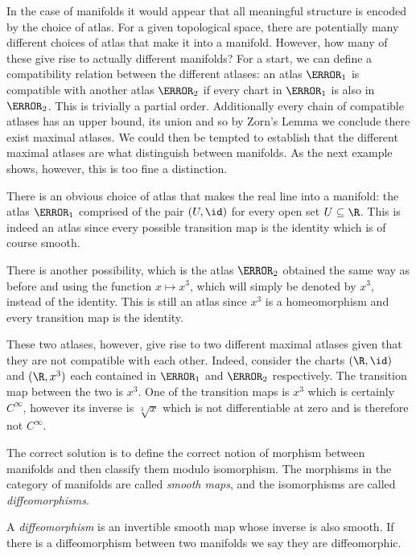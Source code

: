 \documentclass[12pt,oneside]{book}
\begin{document}
In the case of manifolds it would appear that all meaningful structure is encoded by the choice of atlas. For a given topological space, there are potentially many different choices of atlas that make it into a manifold. However, how many of these give rise to actually different manifolds? For a start, we can define a compatibility relation between the different atlases: an atlas \( \A_1 \) is compatible with another atlas \( \A_2 \) if every chart in \( \A_1 \) is also in \( \A_2 \). This is trivially a partial order. Additionally every chain of compatible atlases has an upper bound, its union and so by Zorn's Lemma we conclude there exist maximal atlases. We could then be tempted to establish that the different maximal atlases are what distinguish between manifolds. As the next example shows, however, this is too fine a distinction.

\begin{example} \label{ex:different maximal atlases}
	There is an obvious choice of atlas that makes the real line into a manifold: the atlas \( \A_1 \) comprised of the pair \( (U, \id) \) for every open set \( U \subseteq \R \). This is indeed an atlas since every possible transition map is the identity which is of course smooth. 

	There is another possibility, which is the atlas \( \A_2 \) obtained the same way as before and using the function \( x \mapsto x^3 \), which will simply be denoted by \( x^3 \), instead of the identity. This is still an atlas since \( x^3 \) is a homeomorphism and every transition map is the identity.

	These two atlases, however, give rise to two different maximal atlases given that they are not compatible with each other. Indeed, consider the charts \( (\R, \id) \) and \( (\R, x^3) \) each contained in \( \A_1 \) and \( \A_2 \) respectively. The transition map between the two is \( x^3 \). One of the transition maps is \( x^3 \) which is certainly \( C^\infty \), however its inverse is \( \sqrt[3]{x} \) which is not differentiable at zero and is therefore not \( C^{\infty} \).
\end{example}

The correct solution is to define the correct notion of morphism between manifolds and then classify them modulo isomorphism. The morphisms in the category of manifolds are called \emph{smooth maps}, and the isomorphisms are called \emph{diffeomorphisms}.

\begin{definition}[Diffeomorphism]
	A \emph{diffeomorphism} is an invertible smooth map whose inverse is also smooth. If there is a diffeomorphism between two manifolds we say they are diffeomorphic.
\end{definition}
\end{document}
